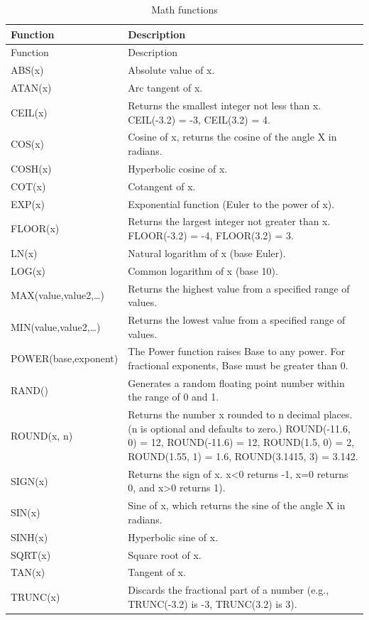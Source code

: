 \documentclass[
]{book}
\theoremstyle{definition}
\theoremstyle{definition}
\theoremstyle{definition}
\theoremstyle{definition}
\theoremstyle{remark}
\begin{document}
\begin{minipage}{\textwidth}

\begin{longtable}[]{@{}
  >{\raggedright\arraybackslash}p{}
  >{\raggedright\arraybackslash}p{}@{}}
\caption{Math functions}\tabularnewline
\toprule
Function & Description \\
\midrule
\endfirsthead
\toprule
Function & Description \\
\midrule
\endhead
ABS(x) & Absolute value of x. \\
ATAN(x) & Arc tangent of x. \\
CEIL(x) & Returns the smallest integer not less than x. CEIL(-3.2) = -3, CEIL(3.2) = 4. \\
COS(x) & Cosine of x, returns the cosine of the angle X in radians. \\
COSH(x) & Hyperbolic cosine of x. \\
COT(x) & Cotangent of x. \\
EXP(x) & Exponential function (Euler to the power of x). \\
FLOOR(x) & Returns the largest integer not greater than x. FLOOR(-3.2) = -4, FLOOR(3.2) = 3. \\
LN(x) & Natural logarithm of x (base Euler). \\
LOG(x) & Common logarithm of x (base 10). \\
MAX(value,value2,\ldots) & Returns the highest value from a specified range of values. \\
MIN(value,value2,\ldots) & Returns the lowest value from a specified range of values. \\
POWER(base,exponent) & The Power function raises Base to any power. For fractional exponents, Base must be greater than 0. \\
RAND() & Generates a random floating point number within the range of 0 and 1. \\
ROUND(x, n) & Returns the number x rounded to n decimal places. (n is optional and defaults to zero.) ROUND(-11.6, 0) = 12, ROUND(-11.6) = 12, ROUND(1.5, 0) = 2, ROUND(1.55, 1) = 1.6, ROUND(3.1415, 3) = 3.142. \\
SIGN(x) & Returns the sign of x. x\textless0 returns -1, x=0 returns 0, and x\textgreater0 returns 1). \\
SIN(x) & Sine of x, which returns the sine of the angle X in radians. \\
SINH(x) & Hyperbolic sine of x. \\
SQRT(x) & Square root of x. \\
TAN(x) & Tangent of x. \\
TRUNC(x) & Discards the fractional part of a number (e.g., TRUNC(-3.2) is -3, TRUNC(3.2) is 3). \\
\bottomrule
\end{longtable}

\end{minipage}
\end{document}
